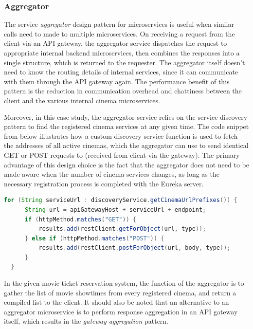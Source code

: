 \subsubsection{Aggregator}

The service \textit{aggregator} design pattern for microservices is useful when similar calls need to made to multiple microservices. On receiving a request from the client via an API gateway, the aggregator service dispatches the request to appropriate internal backend microservices, then combines the responses into a single structure, which is returned to the requester. The aggregator itself doesn't need to know the routing details of internal services, since it can communicate with them through the API gateway again. The performance benefit of this pattern is the reduction in communication overhead and chattiness between the client and the various internal cinema microservices.

Moreover, in this case study, the aggregator service relies on the service discovery pattern to find the registered cinema services at any given time. The code snippet from  below illustrates how a custom discovery service function is used to fetch the addresses of all active cinemas, which the aggregator can use to send identical GET or POST requests to (received from client via the gateway). The primary advantage of this design choice is the fact that the aggregator does not need to be made aware when the number of cinema services changes, as long as the necessary registration process is completed with the Eureka server.

\begin{lstlisting}[language=Java, caption=Snippet from \code{AggregatorService.java}]
  for (String serviceUrl : discoveryService.getCinemaUrlPrefixes()) {
      String url = apiGatewayHost + serviceUrl + endpoint;
      if (httpMethod.matches("GET")) {
          results.add(restClient.getForObject(url, type));
      } else if (httpMethod.matches("POST")) {
          results.add(restClient.postForObject(url, body, type));
      }
  }
\end{lstlisting}

In the given movie ticket reservation system, the function of the aggregator is to gather the list of movie showtimes from every registered cinema, and return a compiled list to the client. It should also be noted that an alternative to an aggregator microservice is to perform response aggregation in an API gateway itself, which results in the \textit{gateway aggregation} pattern.

